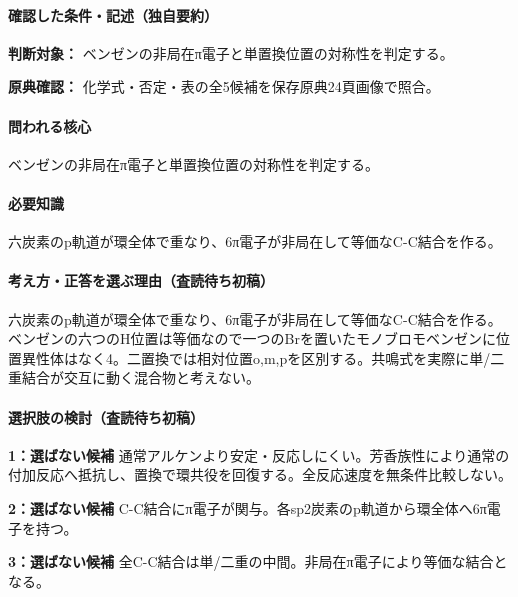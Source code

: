 \paragraph{確認した条件・記述（独自要約）}\mbox{}\par

\noindent\textbf{判断対象：} ベンゼンの非局在π電子と単置換位置の対称性を判定する。\par

\noindent\textbf{原典確認：} 化学式・否定・表の全5候補を保存原典24頁画像で照合。\par

\paragraph{問われる核心} ベンゼンの非局在π電子と単置換位置の対称性を判定する。

\paragraph{必要知識} 六炭素のp軌道が環全体で重なり、6π電子が非局在して等価なC-C結合を作る。

\paragraph{考え方・正答を選ぶ理由（査読待ち初稿）} 六炭素のp軌道が環全体で重なり、6π電子が非局在して等価なC-C結合を作る。ベンゼンの六つのH位置は等価なので一つのBrを置いたモノブロモベンゼンに位置異性体はなく4。二置換では相対位置o,m,pを区別する。共鳴式を実際に単/二重結合が交互に動く混合物と考えない。

\paragraph{選択肢の検討（査読待ち初稿）}\mbox{}\par

\noindent\textbf{1：選ばない候補} 通常アルケンより安定・反応しにくい。芳香族性により通常の付加反応へ抵抗し、置換で環共役を回復する。全反応速度を無条件比較しない。\par

\noindent\textbf{2：選ばない候補} C-C結合にπ電子が関与。各sp2炭素のp軌道から環全体へ6π電子を持つ。\par

\noindent\textbf{3：選ばない候補} 全C-C結合は単/二重の中間。非局在π電子により等価な結合となる。\par

